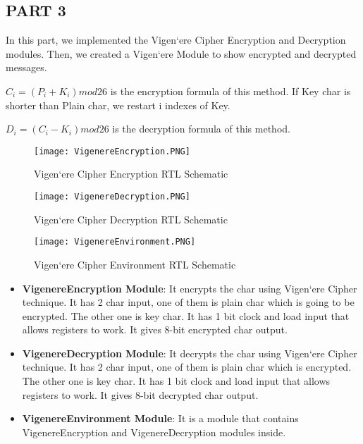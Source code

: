 \documentclass[pdftex,12pt,a4paper]{article}
\begin{document}
\clearpage

\subsection{PART 3}
In this part, we implemented the Vigen`ere Cipher Encryption and Decryption modules. Then, we created a Vigen`ere Module to show encrypted and decrypted messages. 

\(C_i=(P_i+K_i) mod 26\) is the encryption formula of this method. If Key char is shorter than Plain char, we restart i indexes of Key.

\(D_i=(C_i−K_i) mod 26\) is the decryption formula of this method.


\begin{figure}[ht]
	\centering
	\texttt{[image: VigenereEncryption.PNG]}	
	\caption{Vigen`ere Cipher Encryption RTL Schematic}
	\label{}
\end{figure}


\begin{figure}[ht]
	\centering
	\texttt{[image: VigenereDecryption.PNG]}	
	\caption{Vigen`ere Cipher Decryption RTL Schematic}
	\label{}
\end{figure}

\begin{figure}[ht]
	\centering
	\texttt{[image: VigenereEnvironment.PNG]}	
	\caption{Vigen`ere Cipher Environment RTL Schematic}
	\label{}
\end{figure}

\begin{itemize}
\item \textbf{VigenereEncryption Module}: It encrypts the char using Vigen`ere Cipher technique. It has 2 char input, one of them is plain char which is going to be encrypted. The other one is key char. It has 1 bit clock and load input that allows registers to work. It gives 8-bit encrypted char output.

\item \textbf{VigenereDecryption Module}: It decrypts the char using Vigen`ere Cipher technique. It has 2 char input, one of them is plain char which is encrypted. The other one is key char. It has 1 bit clock and load input that allows registers to work. It gives 8-bit decrypted char output.

\item \textbf{VigenereEnvironment Module}: It is a module that contains VigenereEncryption  and VigenereDecryption modules inside.
\end{itemize}
\end{document}
